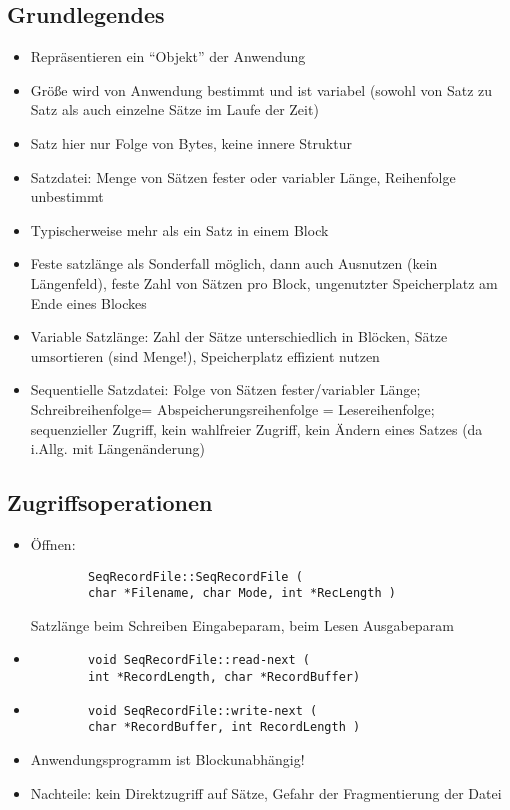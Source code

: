 \documentclass[a4paper, 12pt]{scrartcl}
\begin{document}
\subsection{Grundlegendes}
\begin{itemize}
	\item
		Repräsentieren ein \enquote{Objekt} der Anwendung
	\item
		Größe wird von Anwendung bestimmt und ist variabel (sowohl von Satz zu Satz als auch einzelne Sätze im Laufe der Zeit)
	\item
		Satz hier nur Folge von Bytes, keine innere Struktur
	\item
		Satzdatei: Menge von Sätzen fester oder variabler Länge, Reihenfolge unbestimmt
	\item
		Typischerweise mehr als ein Satz in einem Block
	\item
		Feste satzlänge als Sonderfall möglich, dann auch Ausnutzen (kein Längenfeld), feste Zahl von Sätzen pro Block, ungenutzter Speicherplatz am Ende eines Blockes
	\item
		Variable Satzlänge: Zahl der Sätze unterschiedlich in Blöcken, Sätze umsortieren (sind Menge!), Speicherplatz effizient nutzen
	\item Sequentielle Satzdatei: Folge von Sätzen fester/variabler Länge; Schreibreihenfolge= Abspeicherungsreihenfolge = Lesereihenfolge; sequenzieller Zugriff, kein wahlfreier Zugriff, kein Ändern eines Satzes (da i.Allg. mit Längenänderung)
\end{itemize}
\subsection{Zugriffsoperationen}
\begin{itemize}
	\item Öffnen:

		\begin{lstlisting}
		SeqRecordFile::SeqRecordFile (
		char *Filename, char Mode, int *RecLength )
		\end{lstlisting}
		Satzlänge beim Schreiben Eingabeparam, beim Lesen Ausgabeparam
	\item

		\begin{lstlisting}
		void SeqRecordFile::read-next (
		int *RecordLength, char *RecordBuffer)
		\end{lstlisting}
	\item
		\begin{lstlisting}
		void SeqRecordFile::write-next (
		char *RecordBuffer, int RecordLength )
		\end{lstlisting}
	\item
		Anwendungsprogramm ist Blockunabhängig!
	\item Nachteile: kein Direktzugriff auf Sätze, Gefahr der Fragmentierung der Datei
\end{itemize}
\end{document}
